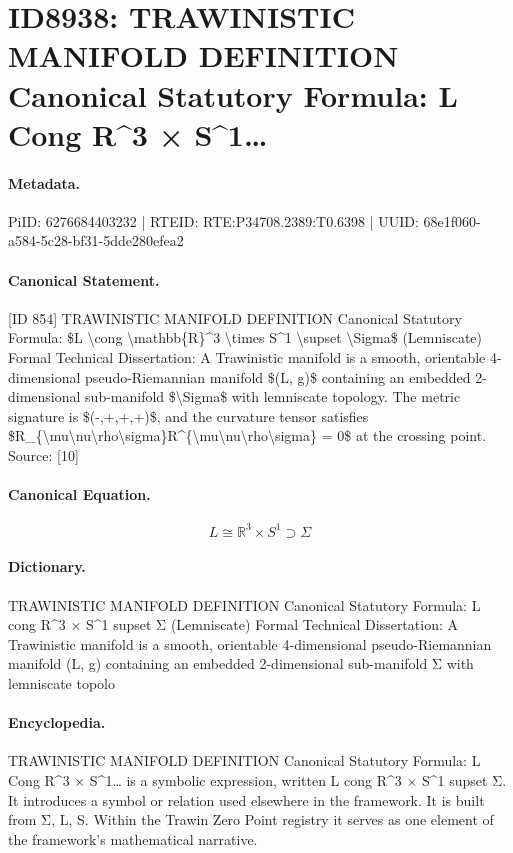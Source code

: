 \section*{ID8938: TRAWINISTIC MANIFOLD DEFINITION Canonical Statutory Formula: L Cong R\textasciicircum{}3 × S\textasciicircum{}1…}
\paragraph{Metadata.}
PiID: 6276684403232 | RTEID: RTE:P34708.2389:T0.6398 | UUID: 68e1f060-a584-5c28-bf31-5dde280efea2

\paragraph{Canonical Statement.}
[ID 854] TRAWINISTIC MANIFOLD DEFINITION Canonical Statutory Formula: \$L \textbackslash{}cong \textbackslash{}mathbb\{R\}\textasciicircum{}3 \textbackslash{}times S\textasciicircum{}1 \textbackslash{}supset \textbackslash{}Sigma\$ (Lemniscate) Formal Technical Dissertation: A Trawinistic manifold is a smooth, orientable 4-dimensional pseudo-Riemannian manifold \$(L, g)\$ containing an embedded 2-dimensional sub-manifold \$\textbackslash{}Sigma\$ with lemniscate topology. The metric signature is \$(-,+,+,+)\$, and the curvature tensor satisfies \$R\_\{\textbackslash{}mu\textbackslash{}nu\textbackslash{}rho\textbackslash{}sigma\}R\textasciicircum{}\{\textbackslash{}mu\textbackslash{}nu\textbackslash{}rho\textbackslash{}sigma\} = 0\$ at the crossing point. Source: [10]

\paragraph{Canonical Equation.}
\[
L \cong \mathbb{R}^3 \times S^1 \supset \Sigma
\]

\paragraph{Dictionary.}
TRAWINISTIC MANIFOLD DEFINITION Canonical Statutory Formula: L cong R\textasciicircum{}3 × S\textasciicircum{}1 supset Σ (Lemniscate) Formal Technical Dissertation: A Trawinistic manifold is a smooth, orientable 4-dimensional pseudo-Riemannian manifold (L, g) containing an embedded 2-dimensional sub-manifold Σ with lemniscate topolo

\paragraph{Encyclopedia.}
TRAWINISTIC MANIFOLD DEFINITION Canonical Statutory Formula: L Cong R\textasciicircum{}3 × S\textasciicircum{}1… is a symbolic expression, written L cong R\textasciicircum{}3 × S\textasciicircum{}1 supset Σ. It introduces a symbol or relation used elsewhere in the framework. It is built from Σ, L, S. Within the Trawin Zero Point registry it serves as one element of the framework's mathematical narrative.
